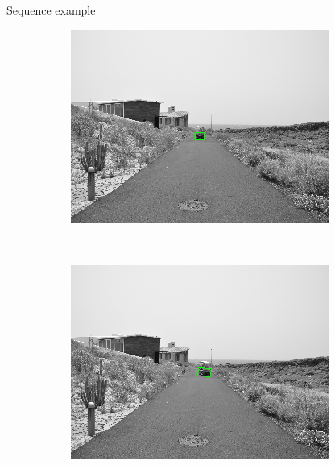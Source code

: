 \begin{frame}{Sequence example}
  \begin{figure}[h!]
      \centering
      \begin{subfigure}[b]{0.24\columnwidth}
	  \includegraphics[width=\textwidth]{sequence/seq1}\label{fig:seq1}
      \end{subfigure}%
      ~
      \begin{subfigure}[b]{0.24\columnwidth}
	  \includegraphics[width=\textwidth]{sequence/seq2}\label{fig:seq2}
      \end{subfigure}%
      ~
      \begin{subfigure}[b]{0.24\columnwidth}

\end{subfigure}
\end{figure}
\end{frame}
